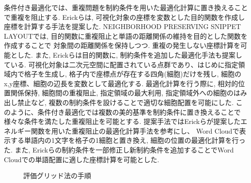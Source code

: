\documentclass[syuuron]{kuee}
\begin{document}
		条件付き最適化では、重複問題を制約条件を用いた最適化計算に置き換えることで重複を阻止する. 
		Erickらは, 可視化対象の座標を変数とした目的関数を作成し座標を計算する手法を提案した\cite{or1}. 
		NEIGHBORHOOD PRESERVING SNIPPET LAYOUTでは, 目的関数に重複阻止と単語の距離関係の維持を目的とした関数を作成することで
		対象間の距離関係を保持しつつ. 重複の発生しない座標計算を可能とした. 
		また, Erickらは目的関数に, 制約条件を追加した最適化手法も提案している\cite{or2}.  
		可視化対象は二次元空間に配置されている点群であり、はじめに指定領域内で格子を生成し, 格子内で座標点が存在する四角(細胞)だけを残し, 
		細胞のx,y座標、細胞の辺長を変数として最適化する. 
		最適化計算を行う際に, 相対的位置関係保持, 細胞間の重複阻止, 指定領域の最大利用, 指定領域外への細胞のはみ出し禁止など, 
		複数の制約条件を設けることで適切な細胞配置を可能にした. 
		このように、条件付き最適化では複数の美的基準を制約条件に置き換えることで様々な条件を満たした重複阻止を可能とする. 
		提案手法ではErickらが提案したエネルギー関数を用いた重複阻止の最適化計算手法を参考にし、
		Word Cloudで表示する単語内の1文字を格子の1細胞と置き換え, 細胞の位置の最適化計算を行った. 
		また, Erickらの制約条件を一部修正し新制約条件を追加することでWord Cloudでの単語配置に適した座標計算を可能とした. 
		
		\begin{figure}
			\begin{center}
			\end{center}
			\caption{評価グリッド法の手順\cite{egm6}}
	  		\label{fig:egm1}
		\end{figure}
\end{document}
